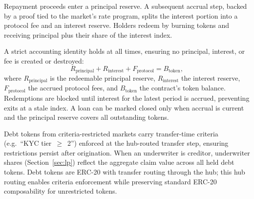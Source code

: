 Repayment proceeds enter a principal reserve. A subsequent accrual step, backed by a proof tied to the market's rate program, splits the interest portion into a protocol fee and an interest reserve. Holders redeem by burning tokens and receiving principal plus their share of the interest index.

A strict accounting identity holds at all times, ensuring no principal, interest, or fee is created or destroyed:
\begin{equation}
  R_{\mathrm{principal}} + R_{\mathrm{interest}} + F_{\mathrm{protocol}} = B_{\mathrm{token}},
  \label{eq:accounting}
\end{equation}
where $R_{\mathrm{principal}}$ is the redeemable principal reserve, $R_{\mathrm{interest}}$ the interest reserve, $F_{\mathrm{protocol}}$ the accrued protocol fees, and $B_{\mathrm{token}}$ the contract's token balance. Redemptions are blocked until interest for the latest period is accrued, preventing exits at a stale index. A loan can be marked closed only when accrual is current and the principal reserve covers all outstanding tokens.

Debt tokens from criteria-restricted markets carry transfer-time criteria (e.g.\ ``KYC tier~$\geq$~2'') enforced at the hub-routed transfer step, ensuring restrictions persist after origination. When an underwriter is creditor, underwriter shares (Section~\ref{sec:lp}) reflect the aggregate claim value across all held debt tokens. Debt tokens are ERC-20 with transfer routing through the hub; this hub routing enables criteria enforcement while preserving standard ERC-20 composability for unrestricted tokens.
